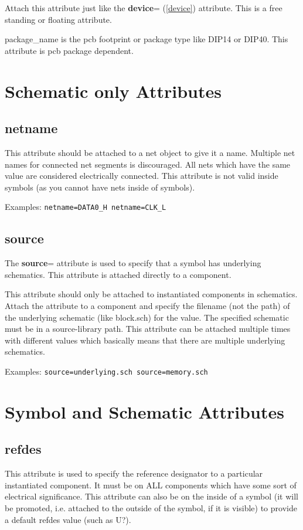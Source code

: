 \documentclass{article}
\begin{document}
Attach this attribute just like the {\bf device}= (\ref{device})
attribute.  This is a free standing or floating attribute.

package\_name is the pcb footprint or package type like DIP14 or DIP40.
This attribute is pcb package dependent.



\section{Schematic only Attributes}

\subsection{{\bf netname}\label{netname}}
This attribute should be attached to a net object to give it a name.
Multiple net names for connected net segments is discouraged.  All nets
which have the same value are considered electrically connected.  This
attribute is not valid inside symbols (as you cannot have nets inside
of symbols).

Examples: \texttt{netname=DATA0\_H netname=CLK\_L}


\subsection{{\bf source}\label{source}}
The {\bf source}= attribute is used to specify that a symbol has underlying
schematics.  This attribute is attached directly to a component.

This attribute should only be attached to instantiated components
in schematics.  Attach the attribute to a component and specify the
filename (not the path) of the underlying schematic (like block.sch)
for the value.  The specified schematic must be in a source-library path.
This attribute can be attached multiple times with different values
which basically means that there are multiple underlying schematics.

Examples: \texttt{source=underlying.sch source=memory.sch}


\section{Symbol and Schematic Attributes}

\subsection{{\bf refdes}\label{refdes}}
This attribute is used to specify the reference designator to a particular
instantiated component.  It must be on ALL components which have some
sort of electrical significance.  This attribute can also be on the
inside of a symbol (it will be promoted, i.e. attached to the outside of
the symbol, if it is visible) to provide a default refdes value (such as
U?).
\end{document}
